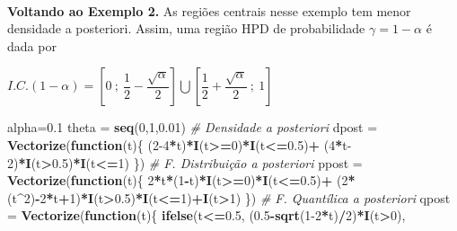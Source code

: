 \documentclass[
]{book}
\newenvironment{Shaded}{\begin{snugshade}}{\end{snugshade}}
\newcommand{\CommentTok}[1]{\textcolor[rgb]{0.56,0.35,0.01}{\textit{#1}}}
\newcommand{\ControlFlowTok}[1]{\textcolor[rgb]{0.13,0.29,0.53}{\textbf{#1}}}
\newcommand{\DecValTok}[1]{\textcolor[rgb]{0.00,0.00,0.81}{#1}}
\newcommand{\FloatTok}[1]{\textcolor[rgb]{0.00,0.00,0.81}{#1}}
\newcommand{\KeywordTok}[1]{\textcolor[rgb]{0.13,0.29,0.53}{\textbf{#1}}}
\newcommand{\NormalTok}[1]{#1}
\newcommand{\OperatorTok}[1]{\textcolor[rgb]{0.81,0.36,0.00}{\textbf{#1}}}
\newcommand{\StringTok}[1]{\textcolor[rgb]{0.31,0.60,0.02}{#1}}
\begin{document}
\(~\)

\textbf{Voltando ao Exemplo 2.} As regiões centrais nesse exemplo tem menor densidade a posteriori. Assim, uma região HPD de probabilidade \(\gamma=1-\alpha\) é dada por

\(I.C.(1-\alpha)=\left[0~;~\dfrac{1}{2}-\dfrac{\sqrt{\alpha}}{2}\right]\bigcup \left[\dfrac{1}{2}+\dfrac{\sqrt{\alpha}}{2}~;~1\right]\)

\begin{Shaded}
\begin{Highlighting}[]
\NormalTok{alpha=}\FloatTok{0.1}
\NormalTok{theta =}\StringTok{ }\KeywordTok{seq}\NormalTok{(}\DecValTok{0}\NormalTok{,}\DecValTok{1}\NormalTok{,}\FloatTok{0.01}\NormalTok{)}
\CommentTok{# Densidade a posteriori}
\NormalTok{dpost =}\StringTok{ }\KeywordTok{Vectorize}\NormalTok{(}\ControlFlowTok{function}\NormalTok{(t)\{ (}\DecValTok{2-4}\OperatorTok{*}\NormalTok{t)}\OperatorTok{*}\KeywordTok{I}\NormalTok{(t}\OperatorTok{>=}\DecValTok{0}\NormalTok{)}\OperatorTok{*}\KeywordTok{I}\NormalTok{(t}\OperatorTok{<=}\FloatTok{0.5}\NormalTok{)}\OperatorTok{+}
\StringTok{    }\NormalTok{(}\DecValTok{4}\OperatorTok{*}\NormalTok{t}\DecValTok{-2}\NormalTok{)}\OperatorTok{*}\KeywordTok{I}\NormalTok{(t}\OperatorTok{>}\FloatTok{0.5}\NormalTok{)}\OperatorTok{*}\KeywordTok{I}\NormalTok{(t}\OperatorTok{<=}\DecValTok{1}\NormalTok{) \})}
\CommentTok{# F. Distribuição a posteriori}
\NormalTok{ppost =}\StringTok{ }\KeywordTok{Vectorize}\NormalTok{(}\ControlFlowTok{function}\NormalTok{(t)\{ }\DecValTok{2}\OperatorTok{*}\NormalTok{t}\OperatorTok{*}\NormalTok{(}\DecValTok{1}\OperatorTok{-}\NormalTok{t)}\OperatorTok{*}\KeywordTok{I}\NormalTok{(t}\OperatorTok{>=}\DecValTok{0}\NormalTok{)}\OperatorTok{*}\KeywordTok{I}\NormalTok{(t}\OperatorTok{<=}\FloatTok{0.5}\NormalTok{)}\OperatorTok{+}
\StringTok{    }\NormalTok{(}\DecValTok{2}\OperatorTok{*}\NormalTok{(t}\OperatorTok{^}\DecValTok{2}\NormalTok{)}\OperatorTok{-}\DecValTok{2}\OperatorTok{*}\NormalTok{t}\OperatorTok{+}\DecValTok{1}\NormalTok{)}\OperatorTok{*}\KeywordTok{I}\NormalTok{(t}\OperatorTok{>}\FloatTok{0.5}\NormalTok{)}\OperatorTok{*}\KeywordTok{I}\NormalTok{(t}\OperatorTok{<=}\DecValTok{1}\NormalTok{)}\OperatorTok{+}\KeywordTok{I}\NormalTok{(t}\OperatorTok{>}\DecValTok{1}\NormalTok{) \})}
\CommentTok{# F. Quantílica a posteriori}
\NormalTok{qpost =}\StringTok{ }\KeywordTok{Vectorize}\NormalTok{(}\ControlFlowTok{function}\NormalTok{(t)\{ }\KeywordTok{ifelse}\NormalTok{(t}\OperatorTok{<=}\FloatTok{0.5}\NormalTok{, (}\FloatTok{0.5}\OperatorTok{-}\KeywordTok{sqrt}\NormalTok{(}\DecValTok{1-2}\OperatorTok{*}\NormalTok{t)}\OperatorTok{/}\DecValTok{2}\NormalTok{)}\OperatorTok{*}\KeywordTok{I}\NormalTok{(t}\OperatorTok{>}\DecValTok{0}\NormalTok{),}

\end{Highlighting}
\end{Shaded}
\end{document}
